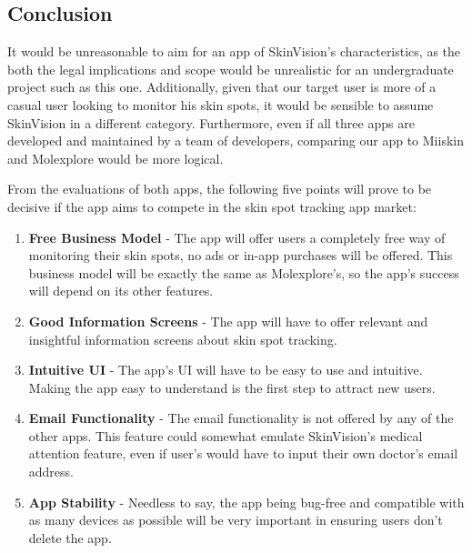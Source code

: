 \subsection{Conclusion}
It would be unreasonable to aim for an app of SkinVision's characteristics, as the both the legal implications and scope would be unrealistic for an undergraduate project such as this one. Additionally, given that our target user is more of a casual user looking to monitor his skin spots, it would be sensible to assume SkinVision in a different category. Furthermore, even if all three apps are developed and maintained by a team of developers, comparing our app to Miiskin and Molexplore would be more logical.

From the evaluations of both apps, the following five points will prove to be decisive if the app aims to compete in the skin spot tracking app market:
\begin{enumerate}
    \item \textbf{Free Business Model} - The app will offer users a completely free way of monitoring their skin spots, no ads or in-app purchases will be offered. This business model will be exactly the same as Molexplore's, so the app's success will depend on its other features.
    \item \textbf{Good Information Screens} - The app will have to offer relevant and insightful information screens about skin spot tracking.
    \item \textbf{Intuitive UI} - The app's UI will have to be easy to use and intuitive. Making the app easy to understand is the first step to attract new users.
    \item \textbf{Email Functionality} - The email functionality is not offered by any of the other apps. This feature could somewhat emulate SkinVision's medical attention feature, even if user's would have to input their own doctor's email address.
    \item \textbf{App Stability} - Needless to say, the app being bug-free and compatible with as many devices as possible will be very important in ensuring users don't delete the app.
\end{enumerate}

